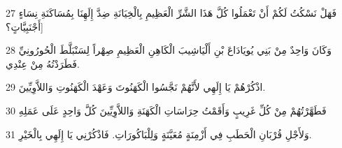 \par 27 فَهَلْ نَسْكُتُ لَكُمْ أَنْ تَعْمَلُوا كُلَّ هَذَا الشَّرِّ الْعَظِيمِ بِالْخِيَانَةِ ضِدَّ إِلَهِنَا بِمُسَاكَنَةِ نِسَاءٍ أَجْنَبِيَّاتٍ؟]
\par 28 وَكَانَ وَاحِدٌ مِنْ بَنِي يُويَادَاعَ بْنِ أَلْيَاشِيبَ الْكَاهِنِ الْعَظِيمِ صِهْراً لِسَنْبَلَّطَ الْحُورُونِيِّ فَطَرَدْتُهُ مِنْ عِنْدِي.
\par 29 اذْكُرْهُمْ يَا إِلَهِي لأَنَّهُمْ نَجَّسُوا الْكَهَنُوتَ وَعَهْدَ الْكَهَنُوتِ وَاللاَّوِيِّينَ.
\par 30 فَطَهَّرْتُهُمْ مِنْ كُلِّ غَرِيبٍ وَأَقَمْتُ حِرَاسَاتِ الْكَهَنَةِ وَاللاَّوِيِّينَ كُلَّ وَاحِدٍ عَلَى عَمَلِهِ
\par 31 وَلأَجْلِ قُرْبَانِ الْحَطَبِ فِي أَزْمِنَةٍ مُعَيَّنَةٍ وَلِلْبَاكُورَاتِ. فَاذْكُرْنِي يَا إِلَهِي بِالْخَيْرِ.

